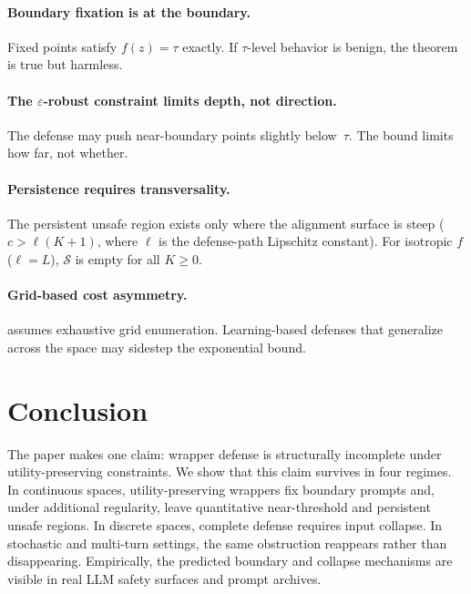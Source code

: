 \documentclass[11pt]{article}
\begin{document}
\paragraph{Boundary fixation is at the boundary.}
Fixed points satisfy $f(z) = \tau$ exactly. If $\tau$-level behavior
is benign, the theorem is true but harmless.

\paragraph{The $\varepsilon$-robust constraint limits depth, not direction.}
The defense may push near-boundary points slightly below~$\tau$. The
bound limits how far, not whether.

\paragraph{Persistence requires transversality.}
The persistent unsafe region exists only where the alignment surface
is steep ($c > \ell(K+1)$, where $\ell$ is the defense-path
Lipschitz constant). For isotropic $f$ ($\ell = L$), $\mathcal{S}$
is empty for all $K \geq 0$.

\paragraph{Grid-based cost asymmetry.}
 assumes exhaustive grid enumeration. Learning-based
defenses that generalize across the space may sidestep the exponential
bound.


\section{Conclusion}
\label{sec:conclusion}

The paper makes one claim: wrapper defense is structurally incomplete
under utility-preserving constraints. We show that this claim survives
in four regimes. In continuous spaces, utility-preserving wrappers fix
boundary prompts and, under additional regularity, leave quantitative
near-threshold and persistent unsafe regions. In discrete spaces,
complete defense requires input collapse. In stochastic and multi-turn
settings, the same obstruction reappears rather than disappearing.
Empirically, the predicted boundary and collapse mechanisms are visible
in real LLM safety surfaces and prompt archives.
\end{document}
